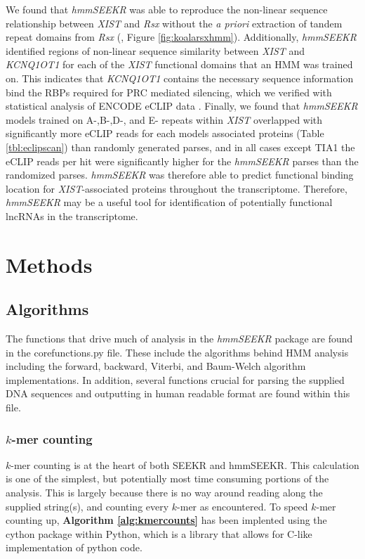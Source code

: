 We found that \emph{hmmSEEKR} was able to reproduce the non-linear sequence relationship between \emph{XIST} and \emph{Rsx} without the \emph{a priori} extraction of tandem repeat domains from \emph{Rsx} (\cite{Sprague2019NonlinearDomains}, Figure \ref{fig:koalarsxhmm}). Additionally, \emph{hmmSEEKR} identified regions of non-linear sequence similarity between \emph{XIST} and \emph{KCNQ1OT1} for each of the \emph{XIST} functional domains that an HMM was trained on. This indicates that \emph{KCNQ1OT1} contains the necessary sequence information bind the RBPs required for PRC mediated silencing, which we verified with statistical analysis of ENCODE eCLIP data \cite{VanNostrand2016RobusteCLIP}. Finally, we found that \emph{hmmSEEKR} models trained on A-,B-,D-, and E- repeats within \emph{XIST} overlapped with significantly more eCLIP reads for each models associated proteins (Table \ref{tbl:eclipscan}) than randomly generated parses, and in all cases except TIA1 the eCLIP reads per hit were significantly higher for the \emph{hmmSEEKR} parses than the randomized parses. \emph{hmmSEEKR} was therefore able to predict functional binding location for \emph{XIST}-associated proteins throughout the transcriptome. Therefore, \emph{hmmSEEKR} may be a useful tool for identification of potentially functional lncRNAs in the transcriptome. 




\section{Methods}
\subsection{Algorithms}
The functions that drive much of analysis in the \emph{hmmSEEKR} package are found in the corefunctions.py file. These include the algorithms behind HMM analysis including the forward, backward, Viterbi, and Baum-Welch algorithm implementations. In addition, several functions crucial for parsing the supplied DNA sequences and outputting in human readable format are found within this file.

\subsubsection{$k$-mer counting}
$k$-mer counting is at the heart of both SEEKR and hmmSEEKR. This calculation is one of the simplest, but potentially most time consuming portions of the analysis. This is largely because there is no way around reading along the supplied string(s), and counting every $k$-mer as encountered. To speed $k$-mer counting up, \textbf{Algorithm \ref{alg:kmercounts}} has been implented using the cython package within Python, which is a library that allows for C-like implementation of python code.

